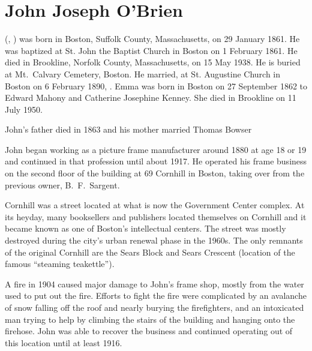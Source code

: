 \section{John Joseph O'Brien}

 (, ) was born in Boston, Suffolk County, Massachusetts, on 29 January 1861.\cite{John3OBrienBirth} He was baptized at St. John the Baptist Church in Boston on 1 February 1861.\cite{John3OBrienBaptism} He died in Brookline, Norfolk County, Massachusetts, on 15 May 1938.\cite{John3OBrienDeath} He is buried at Mt.\ Calvary Cemetery, Boston.\cite{John3OBrienBurial} He married, at St. Augustine Church in Boston on 6 February 1890, .\cite{John3OBrienMarriage,John3OBrienMarriage2} Emma was born in Boston on 27 September 1862 to Edward Mahony and Catherine Josephine Kenney.\cite{EmmaMahonyBaptism} She died in Brookline on 11 July 1950.\cite{EmmaMahonyDeath}

John's father died in 1863\cite{John2OBrienDeath} and his mother married Thomas Bowser 

John began working as a picture frame manufacturer around 1880\cite{John3OBrien1880} at age 18 or 19 and continued in that profession until about 1917.\cite{John3OBrien1916} He operated his frame business on the second floor of the building at 69 Cornhill in Boston,\cite{John3OBrien1916,FrameShopFire} taking over from the previous owner, B.\ F.\ Sargent.\cite{PictureFrameLabel}

Cornhill was a street located at what is now the Government Center complex. At its heyday, many booksellers and publishers located themselves on Cornhill and it became known as one of Boston's intellectual centers.\cite{Cornhill} The street was mostly destroyed during the city's urban renewal phase in the 1960s. The only remnants of the original Cornhill are the Sears Block and Sears Crescent (location of the famous ``steaming teakettle'').\cite{Cornhill} 

A fire in 1904 caused major damage to John's frame shop, mostly from the water used to put out the fire. Efforts to fight the fire were complicated by an avalanche of snow falling off the roof and nearly burying the firefighters, and an intoxicated man trying to help by climbing the stairs of the building and hanging onto the firehose.\cite{FrameShopFire} John was able to recover the business and continued operating out of this location until at least 1916.\cite{John3OBrien1916}

